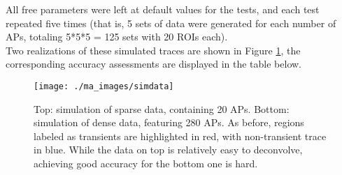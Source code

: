 \documentclass[titlepage]{article}
\begin{document}
All free parameters were left at default values for the tests, and each test repeated five times (that is, 5 sets of data were generated for each number of APs, totaling 5*5*5 = 125 sets with 20 ROIs each).\\
Two realizations of these simulated traces are shown in Figure \ref{fig:simdata}, the corresponding accuracy assessments are displayed in the table below.\\
\begin{figure}[h]
\centering
\texttt{[image: ./ma\_images/simdata]}
\caption{Top: simulation of sparse data, containing 20 APs. Bottom: simulation of dense data, featuring 280 APs. As before, regions labeled as transients are highlighted in red, with non-transient trace in blue. While the data on top is relatively easy to deconvolve, achieving good accuracy for the bottom one is hard.}
\label{fig:simdata}
\end{figure}
\end{document}
